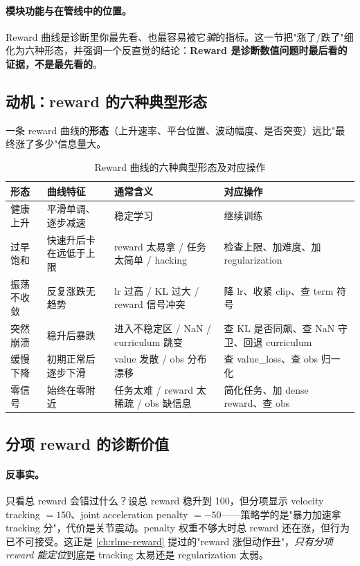 \paragraph{模块功能与在管线中的位置。}Reward 曲线是诊断里你最先看、也最容易被它\emph{骗}的指标。这一节把"涨了/跌了"细化为六种形态，并强调一个反直觉的结论：\textbf{Reward 是诊断数值问题时最后看的证据，不是最先看的}。

\subsection{动机：reward 的六种典型形态}

一条 reward 曲线的\textbf{形态}（上升速率、平台位置、波动幅度、是否突变）远比"最终涨了多少"信息量大。

\begin{table}[H]
\centering
\caption{Reward 曲线的六种典型形态及对应操作}
\label{tab:rlmc-diag-reward6}
\begin{tabular}{p{2.0cm}p{3.6cm}p{3.6cm}p{3.4cm}}
\hline
形态 & 曲线特征 & 通常含义 & 对应操作 \\
\hline
健康上升 & 平滑单调、逐步减速 & 稳定学习 & 继续训练 \\
过早饱和 & 快速升后卡在远低于上限 & reward 太易拿 / 任务太简单 / hacking & 检查上限、加难度、加 regularization \\
振荡不收敛 & 反复涨跌无趋势 & lr 过高 / KL 过大 / reward 信号冲突 & 降 lr、收紧 clip、查 term 符号 \\
突然崩溃 & 稳升后暴跌 & 进入不稳定区 / NaN / curriculum 跳变 & 查 KL 是否同飙、查 NaN 守卫、回退 curriculum \\
缓慢下降 & 初期正常后逐步下滑 & value 发散 / obs 分布漂移 & 查 value\_loss、查 obs 归一化 \\
零信号 & 始终在零附近 & 任务太难 / reward 太稀疏 / obs 缺信息 & 简化任务、加 dense reward、查 obs \\
\hline
\end{tabular}
\end{table}

\subsection{分项 reward 的诊断价值}

\paragraph{反事实。}只看总 reward 会错过什么？设总 reward 稳升到 100，但分项显示 velocity tracking $=150$、joint acceleration penalty $=-50$——策略学的是"暴力加速拿 tracking 分"，代价是关节震动。penalty 权重不够大时总 reward 还在涨，但行为已不可接受。这正是 \cref{ch:rlmc-reward} 提过的"reward 涨但动作丑"，\emph{只有分项 reward 能定位}到底是 tracking 太易还是 regularization 太弱。

